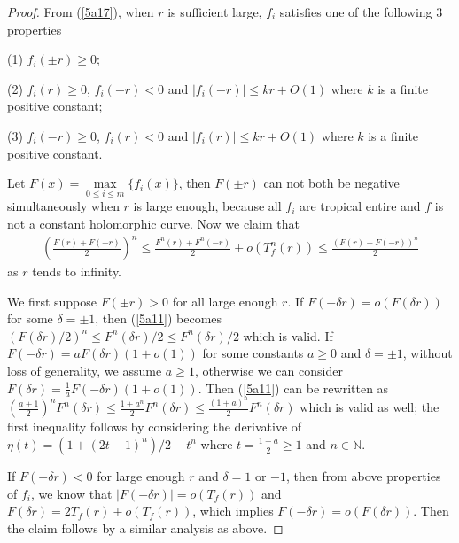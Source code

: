 \documentclass{article}
\begin{document}
\begin{proof}
From (\ref{5a17}), when $r$ is sufficient large, $f_{i}$ satisfies one of the following 3 properties

(1) $f_{i}(\pm r)\geq 0$;

(2) $f_{i}(r)\geq 0$, $f_{i}(-r)<0$ and $|f_{i}(-r)|\leq kr+O(1)$ where $k$ is a finite positive constant;

(3) $f_{i}(-r)\geq 0$, $f_{i}(r)<0$ and $|f_{i}(r)|\leq kr+O(1)$ where $k$ is a finite positive constant.

    Let $F(x)=\max\limits_{0\leq i\leq m}\{f_{i}(x)\}$, then $F(\pm r)$ can not both be negative simultaneously when $r$ is large enough, because all $f_{i}$ are tropical entire and $f$ is not a constant holomorphic curve. Now we claim that
    \begin{eqnarray}\label{5a11}
        \left(\frac{F(r)+F(-r)}{2}\right)^{n}\leq \frac{F^{n}(r)+F^{n}(-r)}{2}+o(T_{f}^{n}(r))\leq \frac{(F(r)+F(-r))^{n}}{2}
    \end{eqnarray}
    as $r$ tends to infinity. 
    
    We first suppose $F(\pm r)>0$ for all large enough $r$. If $F(-\delta r)=o(F(\delta r))$ for some $\delta=\pm 1$, then (\ref{5a11}) becomes $(F(\delta r)/2)^{n}\leq F^{n}(\delta r)/2\leq F^{n}(\delta r)/2$ which is valid. If $F(-\delta r)= a F(\delta r)(1+o(1))$ for some constants $a\geq 0$ and $\delta=\pm 1$, without loss of generality, we assume $a\geq 1$, otherwise we can consider $F(\delta r)= \frac{1}{a}F(-\delta r)(1+o(1))$. Then (\ref{5a11}) can be rewritten as $\left(\frac{a+1}{2}\right)^{n}F^{n}(\delta r)\leq \frac{1+a^{n}}{2}F^{n}(\delta r)\leq \frac{(1+a)^{n}}{2}F^{n}(\delta r)$ which is valid as well; the first inequality follows by considering the derivative of $\eta(t)=(1+(2t-1)^{n})/2-t^{n}$ where $t=\frac{1+a}{2}\geq 1$ and $n\in\mathbb{N}$.

    If $F(-\delta r)<0$ for large enough $r$ and $\delta=1$ or $-1$, then from above properties of $f_{i}$, we know that $|F(-\delta r)|=o(T_{f}(r))$ and $F(\delta r)=2T_{f}(r)+o(T_{f}(r))$, which implies $F(-\delta r)=o(F(\delta r))$. Then the claim follows by a similar analysis as above.
    

\end{proof}
\end{document}
